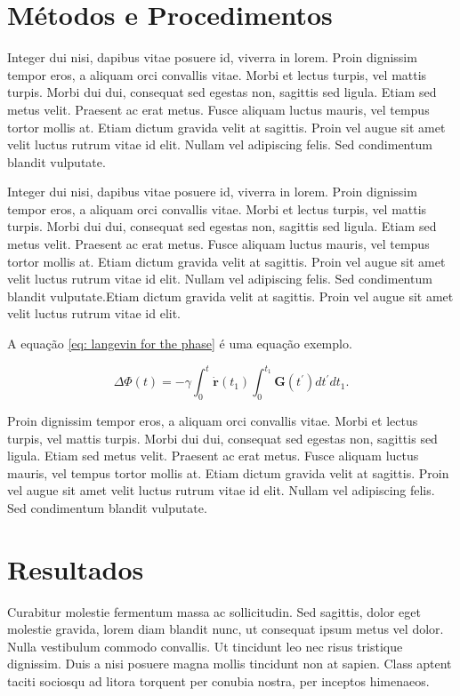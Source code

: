 \documentclass[a4paper,10pt,twocolumn]{article}
\begin{document}
\section*{Métodos e Procedimentos}

Integer dui nisi, dapibus vitae posuere id, viverra in lorem. Proin dignissim tempor eros, a aliquam orci convallis vitae. Morbi et lectus turpis, vel mattis turpis. Morbi dui dui, consequat sed egestas non, sagittis sed ligula. Etiam sed metus velit. Praesent ac erat metus. Fusce aliquam luctus mauris, vel tempus tortor mollis at. Etiam dictum gravida velit at sagittis. Proin vel augue sit amet velit luctus rutrum vitae id elit. Nullam vel adipiscing felis. Sed condimentum blandit vulputate.

Integer dui nisi, dapibus vitae posuere id, viverra in lorem. Proin dignissim tempor eros, a aliquam orci convallis vitae. Morbi et lectus turpis, vel mattis turpis. Morbi dui dui, consequat sed egestas non, sagittis sed ligula. Etiam sed metus velit. Praesent ac erat metus. Fusce aliquam luctus mauris, vel tempus tortor mollis at. Etiam dictum gravida velit at sagittis. Proin vel augue sit amet velit luctus rutrum vitae id elit. Nullam vel adipiscing felis. Sed condimentum blandit vulputate.Etiam dictum gravida velit at sagittis. Proin vel augue sit amet velit luctus rutrum vitae id elit.

A equação \eqref{eq: langevin for the phase} é uma equação exemplo.

\begin{equation}
    \Delta \Phi(t) =-\gamma \int_{0}^{t} \dot{\mathbf{r}}\left(t_{1}\right) \int_{0}^{t_{1}} \mathbf{G}\left(t^{\prime}\right) d t^{\prime} d t_{1}.
    \label{eq: langevin for the phase}
\end{equation}

Proin dignissim tempor eros, a aliquam orci convallis vitae. Morbi et lectus turpis, vel mattis turpis. Morbi dui dui, consequat sed egestas non, sagittis sed ligula. Etiam sed metus velit. Praesent ac erat metus. Fusce aliquam luctus mauris, vel tempus tortor mollis at. Etiam dictum gravida velit at sagittis. Proin vel augue sit amet velit luctus rutrum vitae id elit. Nullam vel adipiscing felis. Sed condimentum blandit vulputate.

\section*{Resultados}

Curabitur molestie fermentum massa ac sollicitudin. Sed sagittis, dolor eget molestie gravida, lorem diam blandit nunc, ut consequat ipsum metus vel dolor. Nulla vestibulum commodo convallis. Ut tincidunt leo nec risus tristique dignissim. Duis a nisi posuere magna mollis tincidunt non at sapien. Class aptent taciti sociosqu ad litora torquent per conubia nostra, per inceptos himenaeos.
\end{document}
